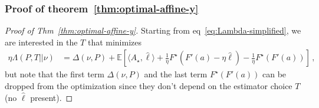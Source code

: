 \documentclass{article}
\theoremstyle{plain}
\theoremstyle{definition}
\newcommand{\E}{\mathbb E}
\newcommand{\hl}{\hat{\ell}\xspace}
\begin{document}
\subsubsection{Proof of theorem~\ref{thm:optimal-affine-y}}
\label{proof:thm:optimal-affine-y}
\begin{proof}[Proof of Thm~\ref{thm:optimal-affine-y}]
    Starting from eq~\ref{eq:Lambda-simplified}, we are interested in the $T$ that minimizes
    \begin{align*}
        \eta \Lambda(P, T || \nu)
         & =
        \Delta(\nu, P) +
        \E\!\left[
            \langle A_\star, \hl \rangle
            + \frac{1}{\eta} F^\star\left(F'(a) - \eta \hl\right)
            - \frac{1}{\eta} F^\star(F'(a))
            \right]\,,
    \end{align*}
    but note that the first term $\Delta(\nu, P)$
    and the last term $F^\star(F'(a))$ can be dropped
    from the optimization since they don't depend on the estimator choice
    $T$ (no $\hl$ present).


\end{proof}
\end{document}
